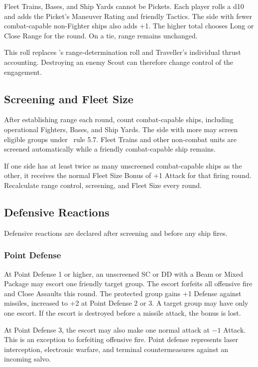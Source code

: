 Fleet Trains, Bases, and Ship Yards cannot be Pickets. Each player rolls a d10
and adds the Picket's Maneuver Rating and friendly Tactics. The side with
fewer combat-capable non-Fighter ships also adds +1. The higher total chooses
Long or Close Range for the round. On a tie, range remains unchanged.

This roll replaces \Imperium's range-determination roll and Traveller's
individual thrust accounting. Destroying an enemy Scout can therefore change
control of the engagement.

\subsection{Screening and Fleet Size}

After establishing range each round, count combat-capable ships, including
operational Fighters, Bases, and Ship Yards. The side with more may screen
eligible groups under \SpaceEmpires\ rule 5.7. Fleet Trains and other
non-combat units are screened automatically while a friendly combat-capable
ship remains.

If one side has at least twice as many unscreened combat-capable ships as the
other, it receives the normal Fleet Size Bonus of +1 Attack for that firing
round. Recalculate range control, screening, and Fleet Size every round.

\subsection{Defensive Reactions}

Defensive reactions are declared after screening and before any ship fires.

\subsubsection{Point Defense}

At Point Defense 1 or higher, an unscreened SC or DD with a Beam or Mixed
Package may escort one friendly target group. The escort forfeits all offensive
fire and Close Assaults this round. The protected group gains +1 Defense
against missiles, increased to +2 at Point Defense 2 or 3. A target group may
have only one escort. If the escort is destroyed before a missile attack, the
bonus is lost.

At Point Defense 3, the escort may also make one normal attack at $-1$ Attack.
This is an exception to forfeiting offensive fire. Point defense represents
laser interception, electronic warfare, and terminal countermeasures against
an incoming salvo.

